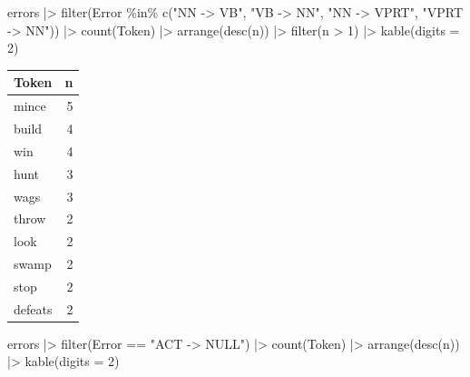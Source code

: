 \documentclass[
  letterpaper,
  DIV=11,
  numbers=noendperiod]{scrreprt}
\newenvironment{Shaded}{\begin{snugshade}}{\end{snugshade}}
\newcommand{\AttributeTok}[1]{\textcolor[rgb]{0.40,0.45,0.13}{#1}}
\newcommand{\DecValTok}[1]{\textcolor[rgb]{0.68,0.00,0.00}{#1}}
\newcommand{\FunctionTok}[1]{\textcolor[rgb]{0.28,0.35,0.67}{#1}}
\newcommand{\NormalTok}[1]{\textcolor[rgb]{0.00,0.23,0.31}{#1}}
\newcommand{\SpecialCharTok}[1]{\textcolor[rgb]{0.37,0.37,0.37}{#1}}
\newcommand{\StringTok}[1]{\textcolor[rgb]{0.13,0.47,0.30}{#1}}
\begin{document}
\begin{Shaded}
\begin{Highlighting}[]
\NormalTok{errors }\SpecialCharTok{|\textgreater{}} 
  \FunctionTok{filter}\NormalTok{(Error }\SpecialCharTok{\%in\%} \FunctionTok{c}\NormalTok{(}\StringTok{"NN {-}\textgreater{} VB"}\NormalTok{, }\StringTok{"VB {-}\textgreater{} NN"}\NormalTok{, }\StringTok{"NN {-}\textgreater{} VPRT"}\NormalTok{, }\StringTok{"VPRT {-}\textgreater{} NN"}\NormalTok{)) }\SpecialCharTok{|\textgreater{}} 
  \FunctionTok{count}\NormalTok{(Token) }\SpecialCharTok{|\textgreater{}} 
  \FunctionTok{arrange}\NormalTok{(}\FunctionTok{desc}\NormalTok{(n)) }\SpecialCharTok{|\textgreater{}} 
  \FunctionTok{filter}\NormalTok{(n }\SpecialCharTok{\textgreater{}} \DecValTok{1}\NormalTok{) }\SpecialCharTok{|\textgreater{}} 
  \FunctionTok{kable}\NormalTok{(}\AttributeTok{digits =} \DecValTok{2}\NormalTok{) }
\end{Highlighting}
\end{Shaded}

\begin{longtable}[]{@{}lr@{}}
\toprule\noalign{}
Token & n \\
\midrule\noalign{}
\endhead
\bottomrule\noalign{}
\endlastfoot
mince & 5 \\
build & 4 \\
win & 4 \\
hunt & 3 \\
wags & 3 \\
throw & 2 \\
look & 2 \\
swamp & 2 \\
stop & 2 \\
defeats & 2 \\
\end{longtable}

\begin{Shaded}
\begin{Highlighting}[]
\NormalTok{errors }\SpecialCharTok{|\textgreater{}} 
  \FunctionTok{filter}\NormalTok{(Error }\SpecialCharTok{==} \StringTok{"ACT {-}\textgreater{} NULL"}\NormalTok{) }\SpecialCharTok{|\textgreater{}} 
  \FunctionTok{count}\NormalTok{(Token) }\SpecialCharTok{|\textgreater{}} 
  \FunctionTok{arrange}\NormalTok{(}\FunctionTok{desc}\NormalTok{(n)) }\SpecialCharTok{|\textgreater{}} 
  \FunctionTok{kable}\NormalTok{(}\AttributeTok{digits =} \DecValTok{2}\NormalTok{) }
\end{Highlighting}
\end{Shaded}
\end{document}
